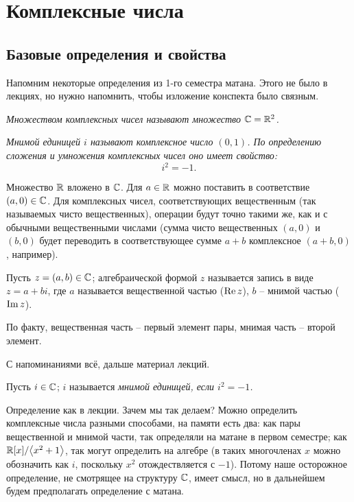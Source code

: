 \section{Комплексные числа}

\subsection{Базовые определения и свойства}

Напомним некоторые определения из 1-го семестра матана. Этого не было в лекциях, но нужно напомнить, чтобы изложение конспекта было связным.

\begin{reminder}
	\it{Множеством комплексных чисел} называют множество $\mathbb{C} = \mathbb{R}^2$.
\end{reminder}

\begin{reminder}
	\it{Мнимой единицей} $i$ называют комплексное число $(0, 1)$. По определению сложения и умножения комплексных чисел оно имеет свойство:
	\[
		i^2 = -1.
	\]
\end{reminder}

\begin{reminder}
	Множество $\mathbb{R}$ вложено в $\mathbb{C}$. Для $a \in \mathbb{R}$ можно поставить в соответствие $(a, 0) \in \mathbb{C}$. Для комплексных чисел, соответствующих вещественным (так называемых чисто вещественных), операции будут точно такими же, как и с обычными вещественными числами (сумма чисто вещественных $(a, 0)$ и $(b, 0)$ будет переводить в соответствующее сумме $a + b$ комплексное $(a + b, 0)$, например).
\end{reminder}
\begin{reminder}
	Пусть $z = (a, b) \in \mathbb{C}$; алгебраической формой $z$ называется запись в виде
	$z = a + bi$, где $a$ называется вещественной частью ($\operatorname{Re} z$), $b$ -- мнимой частью ($\operatorname{Im} z$).
\end{reminder}
\begin{anote}
	По факту, вещественная часть -- первый элемент пары, мнимая часть -- второй элемент.
\end{anote}

С напоминаниями всё, дальше материал лекций.

\begin{definition}
	Пусть $i \in \mathbb{C}$; $i$ называется \it{мнимой единицей}, если $i^2 = -1$.
\end{definition}
\begin{anote}
	Определение как в лекции. Зачем мы так делаем? Можно определить комплексные числа разными способами, на памяти есть два: как пары вещественной и мнимой части, так определяли на матане в первом семестре; как $\mathbb{R}[x] \slash \mathopen{}\left< x^2 + 1 \right>\mathclose{}$, так могут определить на алгебре (в таких многочленах $x$ можно обозначить как $i$, поскольку $x^2$ отождествляется с $-1$). Потому наше осторожное определение, не смотрящее на структуру $\mathbb{C}$, имеет смысл, но в дальнейшем будем предполагать определение с матана.
\end{anote}

